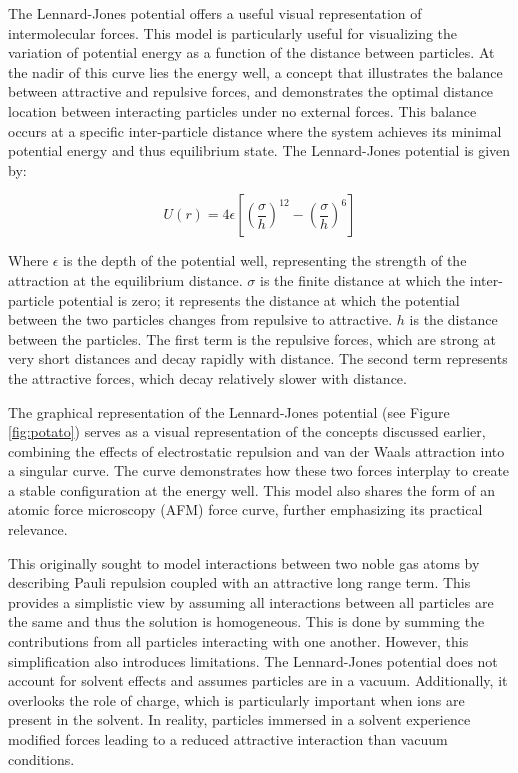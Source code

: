 The Lennard-Jones potential offers a useful visual representation of intermolecular forces. This model is particularly useful for visualizing the variation of potential energy as a function of the distance between particles. At the nadir of this curve lies the energy well, a concept that illustrates the balance between attractive and repulsive forces, and demonstrates the optimal distance location between interacting particles under no external forces. This balance occurs at a specific inter-particle distance where the system achieves its minimal potential energy and thus equilibrium state. The Lennard-Jones potential is given by:

\begin{equation}
U(r) = 4 \epsilon \left[ \left( \frac{\sigma}{h} \right)^{12} - \left( \frac{\sigma}{h} \right)^6 \right]
\end{equation}

Where $\epsilon$ is the depth of the potential well, representing the strength of the attraction at the equilibrium distance. $\sigma$ is the finite distance at which the inter-particle potential is zero; it represents the distance at which the potential between the two particles changes from repulsive to attractive. $h$ is the distance between the particles. The first term is the repulsive forces, which are strong at very short distances and decay rapidly with distance. The second term represents the attractive forces, which decay relatively slower with distance.

The graphical representation of the Lennard-Jones potential (see Figure \ref{fig:potato}) serves as a visual representation of the concepts discussed earlier, combining the effects of electrostatic repulsion and van der Waals attraction into a singular curve. The curve demonstrates how these two forces interplay to create a stable configuration at the energy well. This model also shares the form of an atomic force microscopy (AFM) force curve, further emphasizing its practical relevance. 


This originally sought to model interactions between two noble gas atoms by describing Pauli repulsion coupled with an attractive long range term. This provides a simplistic view by assuming all interactions between all particles are the same and thus the solution is homogeneous. This is done by summing the contributions from all particles interacting with one another. However, this simplification also introduces limitations. The Lennard-Jones potential does not account for solvent effects and assumes particles are in a vacuum. Additionally, it overlooks the role of charge, which is particularly important when ions are present in the solvent. In reality, particles immersed in a solvent experience modified forces leading to a reduced attractive interaction than vacuum conditions.
\cite{lilBlueBook}



